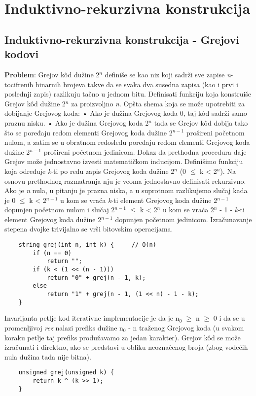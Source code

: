 \documentclass{article}
\begin{document}
\newpage

\section{Induktivno-rekurzivna konstrukcija}
\subsection{Induktivno-rekurzivna konstrukcija - Grejovi kodovi}
\textbf{Problem}: Grejov kôd dužine 2$^n$ definiše se kao niz koji sadrži sve zapise \textit{n}-
tocifrenih binarnih brojeva takve da se svaka dva susedna zapisa (kao i prvi
i poslednji zapis) razlikuju tačno u jednom bitu. Definisati funkciju koja konstruiše Grejov kôd dužine 2$^n$ za proizvoljno \textit{n}.
\newline Opšta shema koja
se može upotrebiti za dobijanje Grejovog koda:\newline
\hspace*{0.2cm}• Ako je dužina Grejovog koda 0, taj kôd sadrži samo praznu nisku.\newline
\hspace*{0.2cm}• Ako je dužina Grejovog koda 2$^n$ tada se Grejov kôd dobija tako što se
poređaju redom elementi Grejovog koda dužine 2$^{n-1}$ prošireni početnom
nulom, a zatim se u obratnom redosledu poređaju redom elementi Grejovog
koda dužine 2$^{n-1}$ prošireni početnom jedinicom.
\newline Dokaz da prethodna procedura daje Grejov može jednostavno izvesti matematičkom inducijom.
\newline Definišimo funkciju koja određuje \textit{k}-ti po redu zapis Grejovog koda dužine 2$^n$
(0 $\leq$ k < 2$^n$). Na osnovu prethodnog razmatranja
nju je veoma jednostavno definisati rekurzivno. Ako je \textit{n} nula, u pitanju je
prazna niska, a u suprotnom razlikujemo slučaj kada je 0 $\leq$ k < 2$^{n-1}$ u kom
se vraća \textit{k}-ti element Grejovog koda dužine 2$^{n-1}$ dopunjen početnom nulom i slučaj 2$^{n-1}$ $\leq$ k < 2$^{n}$ u kom se vraća 2$^{n}$ - 1 - \textit{k}-ti element Grejovog koda
dužine 2$^{n-1}$ dopunjen početnom jedinicom. Izračunavanje stepena dvojke trivijalno se vrši bitovskim operacijama.
\begin{lstlisting}
    string grej(int n, int k) {     // O(n)
        if (n == 0)
            return "";
        if (k < (1 << (n - 1)))
            return "0" + grej(n - 1, k);
        else
            return "1" + grej(n - 1, (1 << n) - 1 - k);
    }
\end{lstlisting}
Invarijanta petlje kod iterativne implementacije je da je n$_0$ $\geq$ n $\geq$ 0 i da se u promenljivoj \textit{rez} nalazi prefiks
dužine n$_0$ - n traženog Grejovog koda (u svakom koraku petlje taj prefiks
produžavamo za jedan karakter).\newline
Grejov kôd se može izračunati i direktno, ako se predstavi u
obliku neoznačenog broja (zbog vodećih nula dužina tada nije bitna).
\begin{lstlisting}
    unsigned grej(unsigned k) {
        return k ^ (k >> 1);
    }
\end{lstlisting}
\end{document}
